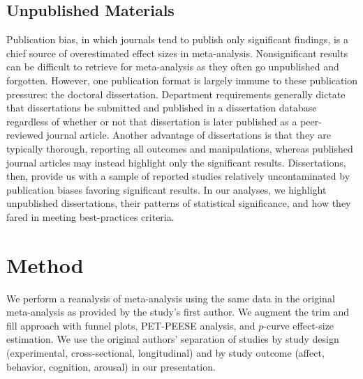 \documentclass[man]{apa6}
\begin{document}

\subsection{Unpublished Materials}
Publication bias, in which journals tend to publish only significant findings, is a chief source of overestimated effect sizes in meta-analysis. Nonsignificant results can be difficult to retrieve for meta-analysis as they often go unpublished and forgotten. However, one publication format is largely immune to these publication pressures: the doctoral dissertation. Department requirements generally dictate that dissertations be submitted and published in a dissertation database regardless of whether or not that dissertation is later published as a peer-reviewed journal article.  Another advantage of dissertations is that they are typically thorough, reporting all outcomes and manipulations, whereas published journal articles may instead highlight only the significant results.  Dissertations, then, provide us with a sample of reported studies relatively uncontaminated by publication biases favoring significant results. In our analyses, we highlight unpublished dissertations, their patterns of statistical significance, and how they fared in meeting best-practices criteria.

\section{Method}
We perform a reanalysis of \citet{Anderson:etal:2010} meta-analysis using the same data in the original meta-analysis as provided by the study's first author.  We augment the trim and fill approach with funnel plots, PET-PEESE analysis, and $p$-curve effect-size estimation. We use the original authors' separation of studies by study design (experimental, cross-sectional, longitudinal) and by study outcome (affect, behavior, cognition, arousal) in our presentation.
\end{document}
